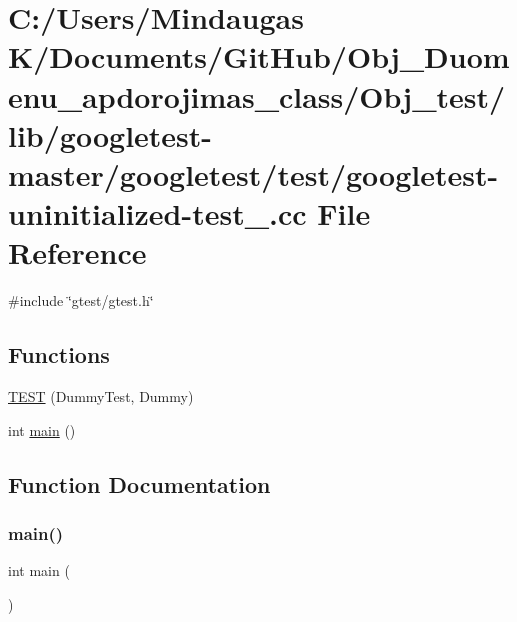 \hypertarget{_obj__test_2lib_2googletest-master_2googletest_2test_2googletest-uninitialized-test___8cc}{}\section{C\+:/\+Users/\+Mindaugas K/\+Documents/\+Git\+Hub/\+Obj\+\_\+\+Duomenu\+\_\+apdorojimas\+\_\+class/\+Obj\+\_\+test/lib/googletest-\/master/googletest/test/googletest-\/uninitialized-\/test\+\_\+.cc File Reference}
\label{_obj__test_2lib_2googletest-master_2googletest_2test_2googletest-uninitialized-test___8cc}
{\ttfamily \#include \char`\"{}gtest/gtest.\+h\char`\"{}}\newline
\subsection*{Functions}
\begin{DoxyCompactItemize}
\item 
\mbox{\hyperlink{_obj__test_2lib_2googletest-master_2googletest_2test_2googletest-uninitialized-test___8cc_a63812c9ef0cbc6907a251ccf919da78e}{T\+E\+ST}} (Dummy\+Test, Dummy)
\item 
int \mbox{\hyperlink{_obj__test_2lib_2googletest-master_2googletest_2test_2googletest-uninitialized-test___8cc_ae66f6b31b5ad750f1fe042a706a4e3d4}{main}} ()
\end{DoxyCompactItemize}


\subsection{Function Documentation}
\mbox{\label{_obj__test_2lib_2googletest-master_2googletest_2test_2googletest-uninitialized-test___8cc_ae66f6b31b5ad750f1fe042a706a4e3d4}} 
\subsubsection{\texorpdfstring{main()}{main()}}
{\footnotesize\ttfamily int main (\begin{DoxyParamCaption}{ }\end{DoxyParamCaption})}

